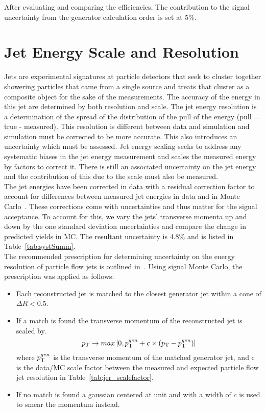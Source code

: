 After evaluating and comparing the efficiencies, The contribution to the signal uncertainty from the generator calculation order is set at 5\%.

\section{Jet Energy Scale and Resolution}
Jets are experimental signatures at particle detectors that seek to cluster together showering particles that came from a single source and treats that cluster as a composite object for the sake of the measurements. The accuracy of the energy in this jet are determined by both resolution and scale. The jet energy resolution is a determination of the spread of the distribution of the pull of the energy (pull = true - measured). This resolution is different between data and simulation and simulation must be corrected to be more accurate. This also introduces an uncertainty which must be assessed. Jet energy scaling seeks to address any systematic biases in the jet energy measurement and scales the measured energy by factors to correct it. There is still an associated uncertainty on the jet energy and the contribution of this due to the scale must also be measured.\\

The jet energies have been corrected in data with a residual correction factor to account for differences between measured jet energies in data and in Monte Carlo~\cite{jes_ref}. These corrections come with uncertainties and thus matter for the signal acceptance. To account for this, we vary the jets' transverse momenta up and down by the one standard deviation uncertainties and compare the change in predicted yields in MC. The resultant uncertainty is 4.8\% and is listed in Table~\ref{tab:systSumm}.\\

The recommended prescription for determining uncertainty on the energy resolution of particle flow jets is outlined in~\cite{jer_ref}. Using signal Monte Carlo, the prescription was applied as follows:
\begin{itemize}
\item Each reconstructed jet is matched to the closest generator jet within a cone of $\Delta R < 0.5$.
\item If a match is found the transverse momentum of the reconstructed jet is scaled by.
\begin{equation}
p_{\mathrm{T}} \rightarrow max \left[0, p_{\mathrm{T}} ^{gen} + c \times \left(p_{\mathrm{T}} - p_{\mathrm{T}} ^{gen} \right) \right]
\end{equation}
where $p_{\mathrm{T}} ^{gen}$ is the transverse momentum of the matched generator jet, and c is the data/MC scale factor between the measured and expected particle flow jet resolution in Table~\ref{tab:jer_scalefactor}.
\item If no match is found a gaussian centered at unit and with a width of $c$ is used to smear the momentum instead.
\end{itemize}

